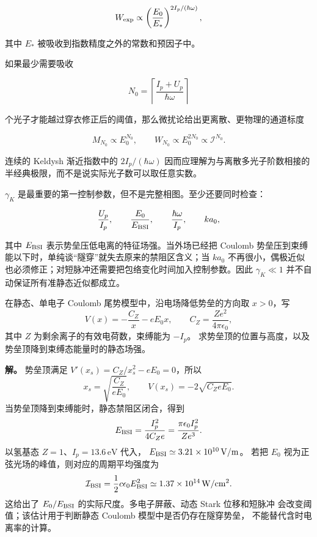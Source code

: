 \[
W_{\rm exp}\propto
\left(\frac{E_0}{E_*}\right)^{2I_p/(\hbar\omega)},
\]

其中 \(E_*\) 被吸收到指数精度之外的常数和预因子中。

如果最少需要吸收

\[
N_0=\left\lceil\frac{I_p+U_p}{\hbar\omega}\right\rceil
\]

个光子才能越过穿衣修正后的阈值，那么微扰论给出更离散、更物理的通道标度

\[
M_{N_0}\propto E_0^{N_0},
\qquad
W_{N_0}\propto E_0^{2N_0}\propto\mathcal I^{N_0}.
\]

连续的 Keldysh 渐近指数中的 \(2I_p/(\hbar\omega)\) 因而应理解为与离散多光子阶数相接的半经典极限，而不是说实际光子数可以取任意实数。



\begin{note}[强场近似的适用条件]

\(\gamma_K\) 是最重要的第一控制参数，但不是完整相图。至少还要同时检查：

\[
\frac{U_p}{I_p},
\qquad
\frac{E_0}{E_{\rm BSI}},
\qquad
\frac{\hbar\omega}{I_p},
\qquad
ka_0,
\]

其中 \(E_{\rm BSI}\) 表示势垒压低电离的特征场强。当外场已经把 Coulomb 势垒压到束缚能以下时，单纯谈“隧穿”就失去原来的禁阻区含义；当 \(ka_0\) 不再很小，偶极近似也必须修正；对短脉冲还需要把包络变化时间加入控制参数。因此 \(\gamma_K\ll1\) 并不自动保证所有准静态近似都成立。

\end{note}

\begin{example}
在静态、单电子 Coulomb 尾势模型中，沿电场降低势垒的方向取 $x>0$，写
\[
V(x)=-\frac{C_Z}{x}-eE_0x,
\qquad C_Z=\frac{Ze^2}{4\pi\epsilon_0},
\]
其中 $Z$ 为剩余离子的有效电荷数，束缚能为 $-I_p$。
求势垒顶的位置与高度，以及势垒顶降到束缚态能量时的静态场强。

\textbf{解。} 势垒顶满足 $V'(x_s)=C_Z/x_s^2-eE_0=0$，所以
\[
x_s=\sqrt{\frac{C_Z}{eE_0}},\qquad
V(x_s)=-2\sqrt{C_ZeE_0}.
\]
当势垒顶降到束缚能时，静态禁阻区闭合，得到
\[
E_{\rm BSI}=\frac{I_p^2}{4C_Ze}
=\frac{\pi\epsilon_0 I_p^2}{Ze^3}.
\]
以氢基态 $Z=1$、$I_p=13.6\,\mathrm{eV}$ 代入，
$E_{\rm BSI}\simeq3.21\times10^{10}\,\mathrm{V/m}$。
若把 $E_0$ 视为正弦光场的峰值，则对应的周期平均强度为
\[
\mathcal I_{\rm BSI}=\frac12 c\epsilon_0 E_{\rm BSI}^2
\simeq1.37\times10^{14}\,\mathrm{W/cm^2}.
\]
这给出了 $E_0/E_{\rm BSI}$ 的实际尺度。多电子屏蔽、动态 Stark 位移和短脉冲
会改变阈值；该估计用于判断静态 Coulomb 模型中是否仍存在隧穿势垒，
不能替代含时电离率的计算。
\end{example}

